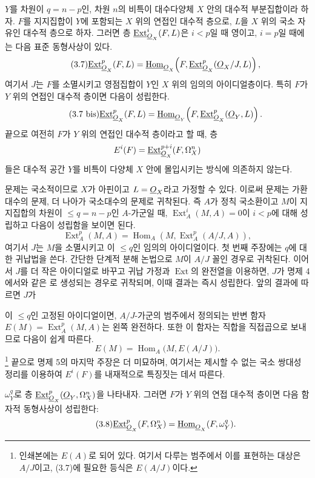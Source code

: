  $Y$를 차원이 $q=n-p$인, 차원 $n$의 비특이
대수다양체 $X$ 안의 대수적 부분집합이라 하자. $F$를 지지집합이
$Y$에 포함되는 $X$ 위의 연접인 대수적 층으로, $L$을 $X$ 위의
국소 자유인 대수적 층으로 하자. 그러면 층
$\underline{\operatorname{Ext}}_{\underline{O}_X}^{i}(F,L)$은 $i<p$일 때 영이고, $i=p$일 때에는 다음
표준 동형사상이 있다.
\begin{equation}\tag{3.7}
  \underline{\operatorname{Ext}}_{\underline{O}_X}^{p}(F,L)
  =\underline{\operatorname{Hom}}_{\underline{O}_X}\!\left(F,
  \underline{\operatorname{Ext}}_{\underline{O}_X}^{p}(\underline{O}_X/J,L)\right),
\end{equation}
여기서 $J$는 $F$를 소멸시키고 영점집합이 $Y$인 $X$ 위의 임의의
아이디얼층이다. 특히 $F$가 $Y$ 위의 연접인 대수적 층이면 다음이 성립한다.
\begin{equation}\tag{3.7 bis}
  \underline{\operatorname{Ext}}_{\underline{O}_X}^{p}(F,L)
  =\underline{\operatorname{Hom}}_{\underline{O}_Y}\!\left(F,\underline{\operatorname{Ext}}_{\underline{O}_X}^{p}(\underline{O}_Y,L)\right).
\end{equation}
끝으로 여전히 $F$가 $Y$ 위의 연접인 대수적 층이라고 할 때, 층
\[
  E^{i}(F)=\underline{\operatorname{Ext}}_{\underline{O}_X}^{p+i}(F,\Omega_X^{n})
\]
들은 대수적 공간 $Y$를 비특이 다양체 $X$ 안에 몰입시키는 방식에
의존하지 않는다.

문제는 국소적이므로 $X$가 아핀이고 $L=\underline{O}_X$라고 가정할 수 있다.
이로써 문제는 가환대수의 문제, 더 나아가 국소대수의 문제로 귀착된다. 즉
$A$가 정칙 국소환이고 $M$이 지지집합의 차원이
$\leq q=n-p$인 $A$-가군일 때, $\operatorname{Ext}_{A}^{i}(M,A)=0$이 $i<p$에 대해 성립하고 다음이 성립함을 보이면 된다.
\[
  \operatorname{Ext}_{A}^{p}(M,A)
  =\operatorname{Hom}_{A}\!\left(M,\operatorname{Ext}_{A}^{p}(A/J,A)\right),
\]
여기서 $J$는 $M$을 소멸시키고 이 $\leq q$인 임의의 아이디얼이다.
첫 번째 주장에는 $q$에 대한 귀납법을 쓴다. 간단한 단계적 분해 논법으로
$M$이 $A/J$ 꼴인 경우로 귀착된다. 이어서 $J$를 더 작은 아이디얼로
바꾸고 귀납 가정과 $\operatorname{Ext}$의 완전열을 이용하면, $J$가
명제 4에서와 같은 로 생성되는 경우로 귀착되며, 이때 결과는 즉시 성립한다. 앞의 결과에 따르면 $J$가

이 $\leq q$인 고정된 아이디얼이면, $A/J$-가군의 범주에서
정의되는 반변 함자 $E(M)=\operatorname{Ext}_{A}^{p}(M,A)$는 왼쪽
완전하다. 또한 이 함자는 직합을 직접곱으로 보내므로 다음이 쉽게 따른다.
\[
  E(M)=\operatorname{Hom}_{A}\bigl(M,E(A/J)\bigr).
\]
\footnote{인쇄본에는 $E(A)$로 되어 있다. 여기서 다루는 범주에서 이를
표현하는 대상은 $A/J$이고, (3.7)에 필요한 등식은 $E(A/J)$이다.} 끝으로
명제 5의 마지막 주장은 더 미묘하며, 여기서는 제시할 수 없는 국소
쌍대성 정리를 이용하여 $E^{i}(F)$를 내재적으로 특징짓는 데서 따른다.

 $\omega_Y^{q}$로 층
$\underline{\operatorname{Ext}}_{\underline{O}_X}^{p}(\underline{O}_Y,\Omega_X^{n})$을 나타내자. 그러면
$F$가 $Y$ 위의 연접 대수적 층이면 다음 함자적 동형사상이 성립한다:
\begin{equation}\tag{3.8}
  \underline{\operatorname{Ext}}_{\underline{O}_X}^{p}(F,\Omega_X^{n})
  =\underline{\operatorname{Hom}}_{\underline{O}_X}(F,\omega_Y^{q}).
\end{equation}

